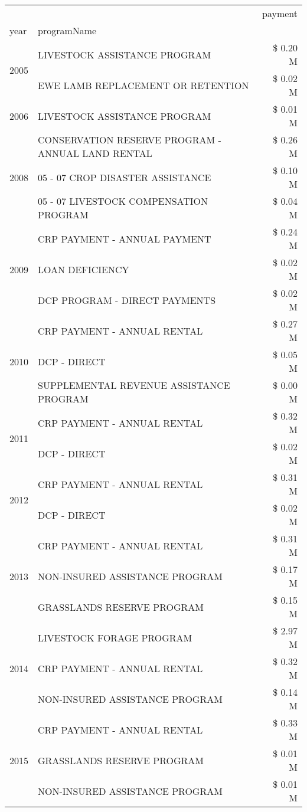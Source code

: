 \begin{tabular}{llr}
\toprule
 &  & payment \\
year & programName &  \\
\midrule
\multirow[t]{2}{*}{2005} & LIVESTOCK ASSISTANCE PROGRAM & \$ 0.20 M \\
 & EWE LAMB REPLACEMENT OR RETENTION & \$ 0.02 M \\
\cline{1-3}
2006 & LIVESTOCK ASSISTANCE PROGRAM & \$ 0.01 M \\
\cline{1-3}
\multirow[t]{3}{*}{2008} & CONSERVATION RESERVE PROGRAM - ANNUAL LAND RENTAL & \$ 0.26 M \\
 & 05 - 07 CROP DISASTER ASSISTANCE & \$ 0.10 M \\
 & 05 - 07 LIVESTOCK COMPENSATION PROGRAM & \$ 0.04 M \\
\cline{1-3}
\multirow[t]{3}{*}{2009} & CRP PAYMENT - ANNUAL PAYMENT & \$ 0.24 M \\
 & LOAN DEFICIENCY & \$ 0.02 M \\
 & DCP PROGRAM - DIRECT PAYMENTS & \$ 0.02 M \\
\cline{1-3}
\multirow[t]{3}{*}{2010} & CRP PAYMENT - ANNUAL RENTAL & \$ 0.27 M \\
 & DCP - DIRECT & \$ 0.05 M \\
 & SUPPLEMENTAL REVENUE ASSISTANCE PROGRAM & \$ 0.00 M \\
\cline{1-3}
\multirow[t]{2}{*}{2011} & CRP PAYMENT - ANNUAL RENTAL & \$ 0.32 M \\
 & DCP - DIRECT & \$ 0.02 M \\
\cline{1-3}
\multirow[t]{2}{*}{2012} & CRP PAYMENT - ANNUAL RENTAL & \$ 0.31 M \\
 & DCP - DIRECT & \$ 0.02 M \\
\cline{1-3}
\multirow[t]{3}{*}{2013} & CRP PAYMENT - ANNUAL RENTAL & \$ 0.31 M \\
 & NON-INSURED ASSISTANCE PROGRAM & \$ 0.17 M \\
 & GRASSLANDS RESERVE PROGRAM & \$ 0.15 M \\
\cline{1-3}
\multirow[t]{3}{*}{2014} & LIVESTOCK FORAGE PROGRAM & \$ 2.97 M \\
 & CRP PAYMENT - ANNUAL RENTAL & \$ 0.32 M \\
 & NON-INSURED ASSISTANCE PROGRAM & \$ 0.14 M \\
\cline{1-3}
\multirow[t]{3}{*}{2015} & CRP PAYMENT - ANNUAL RENTAL & \$ 0.33 M \\
 & GRASSLANDS RESERVE PROGRAM & \$ 0.01 M \\
 & NON-INSURED ASSISTANCE PROGRAM & \$ 0.01 M \\

\end{tabular}
